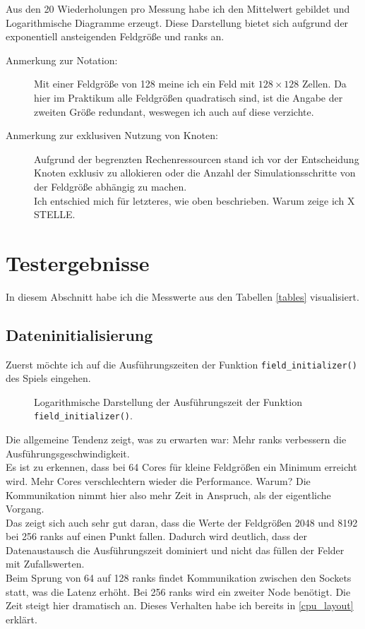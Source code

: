 \documentclass[german,plainarticle,hyperref,utf8]{zihpub}
\begin{document}
	Aus den 20 Wiederholungen pro Messung habe ich den Mittelwert gebildet und Logarithmische Diagramme erzeugt. Diese Darstellung bietet sich aufgrund der exponentiell ansteigenden Feldgröße und ranks an.
	\begin{description}
		\item[Anmerkung zur Notation:] Mit einer Feldgröße von 128 meine ich ein Feld mit $128\times 128$ Zellen. Da hier im Praktikum alle Feldgrößen quadratisch sind, ist die Angabe der zweiten Größe redundant, weswegen ich auch auf diese verzichte.
		\item[Anmerkung zur exklusiven Nutzung von Knoten:] Aufgrund der begrenzten Rechenressourcen stand ich vor der Entscheidung Knoten exklusiv zu allokieren oder die Anzahl der Simulationsschritte von der Feldgröße abhängig zu machen.\\
		Ich entschied mich für letzteres, wie oben beschrieben. Warum zeige ich X STELLE.
	\end{description}

	\newpage
	\section{Testergebnisse} \label{erg}
	In diesem Abschnitt habe ich die Messwerte aus den Tabellen \ref{tables} visualisiert.
	\subsection{Dateninitialisierung}
	Zuerst möchte ich auf die Ausführungszeiten der Funktion \texttt{field\_initializer()} des Spiels eingehen.\\
	
	\begin{figure}[h]
		\centering
		
		\caption{Logarithmische Darstellung der Ausführungszeit der Funktion \texttt{field\_initializer()}.}
	\end{figure}
	Die allgemeine Tendenz zeigt, was zu erwarten war: Mehr ranks verbessern die Ausführungsgeschwindigkeit.\\
	Es ist zu erkennen, dass bei 64 Cores für kleine Feldgrößen ein Minimum erreicht wird. Mehr Cores verschlechtern wieder die Performance. Warum? Die Kommunikation nimmt hier also mehr Zeit in Anspruch, als der eigentliche Vorgang.\\
	Das zeigt sich auch sehr gut daran, dass die Werte der Feldgrößen 2048 und 8192 bei 256 ranks auf einen Punkt fallen. Dadurch wird deutlich, dass der Datenaustausch die Ausführungszeit dominiert und nicht das füllen der Felder mit Zufallswerten.\\
	Beim Sprung von 64 auf 128 ranks findet Kommunikation zwischen den Sockets statt, was die Latenz erhöht. Bei 256 ranks wird ein zweiter Node benötigt. Die Zeit steigt hier dramatisch an. Dieses Verhalten habe ich bereits in \ref{cpu_layout} erklärt.
\end{document}
